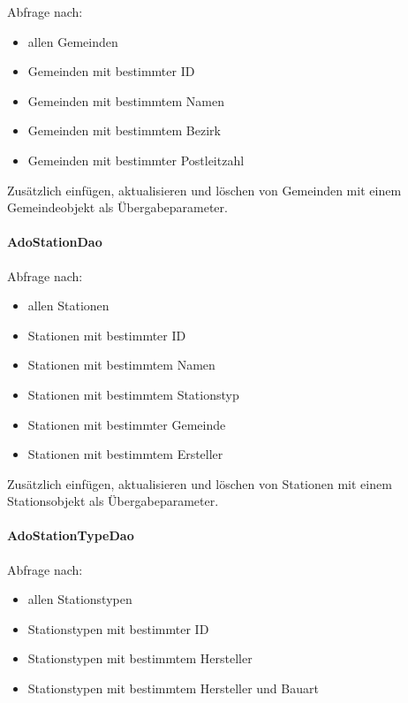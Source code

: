 Abfrage nach:

\begin{itemize}

\item
  allen Gemeinden
\item
  Gemeinden mit bestimmter ID
\item
  Gemeinden mit bestimmtem Namen
\item
  Gemeinden mit bestimmtem Bezirk
\item
  Gemeinden mit bestimmter Postleitzahl
\end{itemize}

Zusätzlich einfügen, aktualisieren und löschen von Gemeinden mit einem
Gemeindeobjekt als Übergabeparameter.


\paragraph{AdoStationDao}\label{adostationdao}

Abfrage nach:

\begin{itemize}

\item
  allen Stationen
\item
  Stationen mit bestimmter ID
\item
  Stationen mit bestimmtem Namen
\item
  Stationen mit bestimmtem Stationstyp
\item
  Stationen mit bestimmter Gemeinde
\item 
  Stationen mit bestimmtem Ersteller
\end{itemize}

Zusätzlich einfügen, aktualisieren und löschen von Stationen mit einem
Stationsobjekt als Übergabeparameter.


\paragraph{AdoStationTypeDao}\label{adostationtypedao}

Abfrage nach:

\begin{itemize}

\item
  allen Stationstypen
\item
  Stationstypen mit bestimmter ID
\item
  Stationstypen mit bestimmtem Hersteller
\item
  Stationstypen mit bestimmtem Hersteller und Bauart
\end{itemize}

